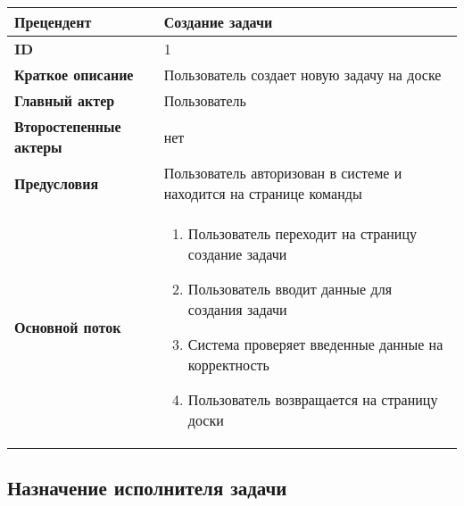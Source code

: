 \documentclass{article}
\begin{document}
\begin{tabular}{|l|p{9cm}|}
	\hline
	\textbf{Прецендент}            & Создание задачи                                                    \\
	\hline
	\textbf{ID}                    & 1                                                                  \\
	\hline
	\textbf{Краткое описание}      & Пользователь создает новую задачу на доске                         \\
	\hline
	\textbf{Главный актер}         & Пользователь                                                       \\
	\hline
	\textbf{Второстепенные актеры} & нет                                                                \\
	\hline
	\textbf{Предусловия}           & Пользователь авторизован в системе и находится на странице команды \\
	\hline
	\textbf{Основной поток}        & \begin{enumerate}
		                                 \item Пользователь переходит на страницу создание задачи
		                                 \item Пользователь вводит данные для создания задачи
		                                 \item Система проверяет введенные данные на корректность
		                                 \item Пользователь возвращается на страницу доски
	                                 \end{enumerate}            \\
	\hline
\end{tabular}

\subsection{Назначение исполнителя задачи}
\end{document}
